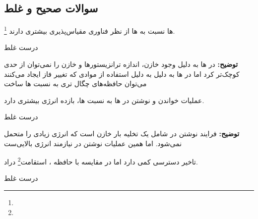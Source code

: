 \documentclass[12pt]{exam}
\newcommand{\class}{\ThesisClass}
\begin{document}

\pagestyle{empty}


\pagestyle{head}
\firstpageheader{}{}{}
\runningheader{صفحه \thepage\ از \numpages}{}{\class}
\runningheadrule

\newcommand{\tf}[1][{}]{%
	\fillin[#1][0.25in]%
}


\vspace{0pt}


\begin{questions}



	\section{سوالات صحیح و غلط}
	
	
	\printanswers
	\question
	\footnote{} ها نسبت به  ها از نظر فناوری مقیاس‌پذیری بیشتری دارند.
	 
	 \begin{checkboxes}
	 	\CorrectChoice درست
	 	 \choice غلط
	 \end{checkboxes}
	 
	 \textbf{توضیح:} در  ها به دلیل وجود خازن، اندازه ترانزیستور‌ها و خازن را نمی‌توان از حدی کوچک‌تر کرد اما در  ها به دلیل به دلیل استفاده از موادی که تغییر فاز ایجاد می‌کنند می‌توان حافظه‌های چگال تری به نسبت  ها ساخت	 
	
	
	
	\printanswers
	\question
	عملیات خواندن و نوشتن در  ها به نسبت  ها، بازده انرژی بیشتری دارد.
	
	 \begin{checkboxes}
		\choice درست
		\CorrectChoice غلط
	\end{checkboxes}
	
	\textbf{توضیح:} فرایند نوشتن در  شامل یک تخلیه بار خازن است که انرژی زیادی را متحمل نمی‌شود. اما همین عملیات نوشتن در  نیازمند انرژی بالایی‌ست 
	
	
	\printanswers
	\question
	 تاخیر دسترسی کمی دارد اما در مقایسه با حافظه ، استقامت\footnote{} دراد. 
	
	\begin{checkboxes}
		\choice درست
		\CorrectChoice غلط
	\end{checkboxes}
	

\end{questions}
\end{document}
